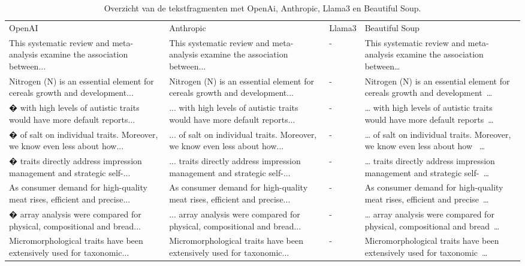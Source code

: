 \begin{table}[h!]
    \tiny
    \caption{Overzicht van de tekstfragmenten met OpenAi, Anthropic, Llama3 en Beautiful Soup.}
    \centering
    \begin{sideways}
    \begin{tabularx}{\textwidth}{|X|X|p{1cm}|X|} 
        \hline
        \rowcolor{lightgray}
        \multicolumn{4}{|X|}{Tekst}\\ 
        \hline
        \rowcolor{lightgray}
        OpenAI & Anthropic & Llama3 & Beautiful Soup \\ 
        \hline
        This systematic review and meta-analysis examine the association between... & This systematic review and meta-analysis examine the association between... & - & This systematic review and meta-analysis examine the association between…\\ 
        Nitrogen (N) is an essential element for cereals growth and development... & Nitrogen (N) is an essential element for cereals growth and development... & - & Nitrogen (N) is an essential element for cereals growth and development …\\
        � with high levels of autistic traits would have more default reports... & ... with high levels of autistic traits would have more default reports... & - & … with high levels of autistic traits would have more default reports …\\
        � of salt on individual traits. Moreover, we know even less about how... & ... of salt on individual traits. Moreover, we know even less about how... & - & … of salt on individual traits. Moreover, we know even less about how  …\\
        � traits directly address impression management and strategic self-... & ... traits directly address impression management and strategic self-... & - & … traits directly address impression management and strategic self- …\\
        As consumer demand for high-quality meat rises, efficient and precise... & As consumer demand for high-quality meat rises, efficient and precise... & - & As consumer demand for high-quality meat rises, efficient and precise …\\
        � array analysis were compared for physical, compositional and bread... & ... array analysis were compared for physical, compositional and bread... & - & … array analysis were compared for physical, compositional and bread …\\
        Micromorphological traits have been extensively used for taxonomic... & Micromorphological traits have been extensively used for taxonomic... & - & Micromorphological traits have been extensively used for taxonomic …\\

\end{tabularx}
\end{sideways}
\end{table}
